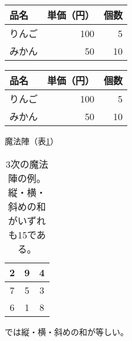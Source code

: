 \documentclass{jsarticle}
\begin{document}
\begin{center}
	\begin{tabular}{lrr} \toprule
		品名   & 単価（円） & 個数 \\ \midrule
		りんご & 100        & 5    \\
		みかん & 50         & 10 \\ \bottomrule
	\end{tabular}
\end{center}

\begin{center}
	\begin{tabular}{|l|r|r|} \hline
		品名   & 単価（円） & 個数 \\ \hline
		りんご & 100        & 5    \\ \cline{1-1}
		みかん & 50         & 10 \\ \hline
	\end{tabular}
\end{center}

魔法陣（表\ref{mahou}）
\begin{table}
	\caption[3次の魔法陣]{3次の魔法陣の例。
	縦・横・斜めの和がいずれも15である。}
	\label{mahou}
	\begin{center}
		\setlength{\tabcolsep}{3pt}
		\footnotesize
		\begin{tabular}{|c|c|c|} \hline
			2 & 9 & 4 \\ \hline
			7 & 5 & 3 \\ \hline
			6 & 1 & 8 \\ \hline
		\end{tabular}
	\end{center}
\end{table}%
では縦・横・斜めの和が等しい。
\end{document}
